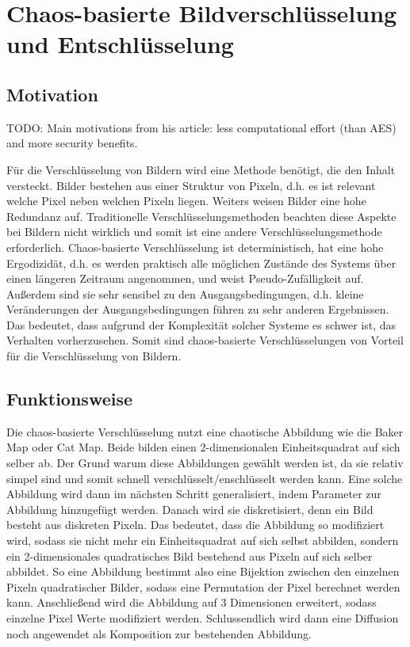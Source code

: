 \section{Chaos-basierte Bildverschlüsselung und Entschlüsselung}
\subsection{Motivation}
TODO: Main motivations from his article: less computational effort (than AES) and more security benefits.

Für die Verschlüsselung von Bildern wird eine Methode benötigt, die den Inhalt
versteckt. Bilder bestehen aus einer Struktur von Pixeln, d.h. es ist relevant welche Pixel neben welchen
Pixeln liegen. Weiters weisen Bilder eine hohe Redundanz auf. Traditionelle Verschlüsselungsmethoden beachten
diese Aspekte bei Bildern nicht wirklich und somit ist eine andere Verschlüsselungsmethode erforderlich.
Chaos-basierte Verschlüsselung ist deterministisch, hat eine hohe Ergodizidät, d.h. es werden praktisch alle
möglichen Zustände des Systems über einen längeren Zeitraum angenommen, und weist Pseudo-Zufälligkeit auf. Außerdem
sind sie sehr sensibel zu den Ausgangsbedingungen, d.h. kleine Veränderungen der Ausgangsbedingungen führen zu
sehr anderen Ergebnissen. Das bedeutet, dass aufgrund der Komplexität solcher Systeme es schwer ist,
das Verhalten vorherzusehen.
Somit sind chaos-basierte Verschlüsselungen von Vorteil für die Verschlüsselung von Bildern.
\cite{zhang2023}

\subsection{Funktionsweise} %
Die chaos-basierte Verschlüsselung nutzt eine chaotische Abbildung wie die Baker Map oder Cat Map. Beide bilden
einen 2-dimensionalen Einheitsquadrat auf sich selber ab. Der Grund warum diese Abbildungen gewählt werden ist, da
sie relativ simpel sind und somit schnell verschlüsselt/enschlüsselt werden kann. 
Eine solche Abbildung wird dann im nächsten Schritt generalisiert, indem Parameter zur Abbildung hinzugefügt werden.
Danach wird sie diskretisiert, denn ein Bild besteht aus diskreten Pixeln. Das bedeutet, dass die Abbildung so
modifiziert wird, sodass sie nicht mehr ein Einheitsquadrat auf sich selbst abbilden, sondern ein 2-dimensionales quadratisches
Bild bestehend aus Pixeln auf sich selber abbildet. So eine Abbildung bestimmt also eine Bijektion zwischen den einzelnen Pixeln
quadratischer Bilder, sodass eine Permutation der Pixel berechnet werden kann. Anschließend wird die Abbildung auf 3 Dimensionen erweitert,
sodass einzelne Pixel Werte modifiziert werden. Schlussendlich wird dann eine Diffusion noch angewendet als Komposition zur bestehenden
Abbildung.
\cite{fridrich97}

